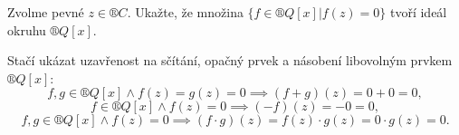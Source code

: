 \documentclass[12pt]{article}                   %
\begin{document}
    \begin{priklad}[3.4]
        Zvolme pevné $z \in ®C$. Ukažte, že množina $\{f \in ®Q[x] | f(z) = 0\}$ tvoří ideál okruhu $®Q[x]$.

        \begin{dukazin}
            Stačí ukázat uzavřenost na sčítání, opačný prvek a násobení libovolným prvkem $®Q[x]$:
            $$ f, g \in ®Q[x] \land f(z) = g(z) = 0 \implies (f+g)(z) = 0 + 0 = 0, $$
            $$ f \in ®Q[x] \land f(z) = 0 \implies (-f)(z) = -0 = 0, $$ 
            $$ f, g \in ®Q[x] \land f(z) = 0 \implies (f·g)(z) = f(z)·g(z) = 0·g(z) = 0. $$ 
        \end{dukazin}
    \end{priklad}
\end{document}
